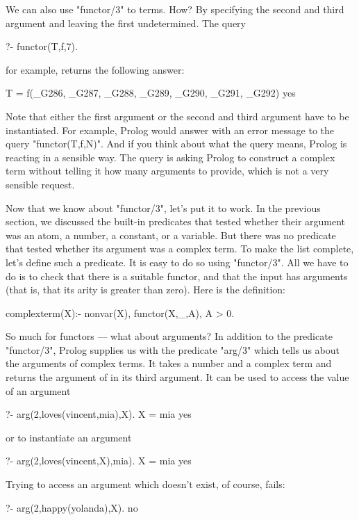 We can also use
"functor/3" to  terms. How?
By specifying the second and third argument and leaving the first
undetermined.  The query
\begin{LPNcodedisplay}
?- functor(T,f,7).
\end{LPNcodedisplay}
for example, returns the following answer:
\begin{LPNcodedisplay}
T = f(_G286, _G287, _G288, _G289, _G290, _G291, _G292)
yes
\end{LPNcodedisplay}
Note that either the first argument or the second and third argument
have to be instantiated. For example, Prolog would answer with an
error message to the query "functor(T,f,N)". And if you think about
what the query means, Prolog is  reacting in a sensible
way. The query is asking Prolog to construct a complex term without
telling it how many arguments to provide, which is not a very sensible
request.

Now that we know about "functor/3", let's put it to work.  In the
previous section, we discussed the built-in predicates that tested
whether their argument was an atom, a number, a constant, or a
variable. But there was no predicate that tested whether its argument
was a complex term.  To make the list complete, let's define such a
predicate. It is easy to do so using "functor/3".  All we have to do
is to check that there is a suitable functor, and that the input has
arguments (that is, that its arity is greater than zero).  Here is the
definition:

\begin{LPNcodedisplay}
complexterm(X):-
   nonvar(X),
   functor(X,_,A),
   A > 0.
\end{LPNcodedisplay}

So much for functors --- what about arguments?  In addition to
the predicate "functor/3", Prolog
supplies us with the predicate "arg/3" which tells us about the
arguments of complex terms. It takes a number  and a
complex term  and returns the  argument of
 in its third argument.  It can be used to access the value
of an argument
\begin{LPNcodedisplay}
?- arg(2,loves(vincent,mia),X).
X = mia
yes
\end{LPNcodedisplay}
or to instantiate an argument
\begin{LPNcodedisplay}
?- arg(2,loves(vincent,X),mia).
X = mia
yes
\end{LPNcodedisplay}
Trying to access an argument which doesn't exist, of course, fails:
\begin{LPNcodedisplay}
?- arg(2,happy(yolanda),X).
no
\end{LPNcodedisplay}

